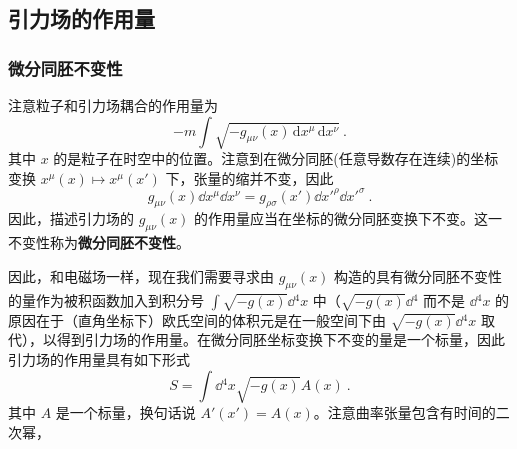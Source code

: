 \subsection{引力场的作用量}

\subsubsection{微分同胚不变性}
注意粒子和引力场耦合的作用量为
\begin{equation}
-m\int\sqrt{-g_{\mu\nu}(x) \,\mathrm{d}{x} ^\mu \,\mathrm{d}{x} ^\nu}~.
\end{equation}
其中 $x$ 的是粒子在时空中的位置。注意到在微分同胚(任意导数存在连续)的坐标变换 $x^\mu(x) \mapsto x^\mu(x')$ 下，张量的缩并不变，因此
\begin{equation}
g_{\mu\nu}(x) \dd x^\mu \dd{x} ^\nu=g_{\rho\sigma}(x') \dd{x'} ^\rho \dd{x'} ^{\sigma}~.
\end{equation}
因此，描述引力场的 $g_{\mu\nu}(x)$ 的作用量应当在坐标的微分同胚变换下不变。这一不变性称为\textbf{微分同胚不变性}。

因此，和电磁场一样，现在我们需要寻求由 $g_{\mu\nu}(x)$ 构造的具有微分同胚不变性的量作为被积函数加入到积分号 $\int\sqrt{-g(x)}\dd{}^4x$ 中（$\sqrt{-g(x)}\dd{}^4$ 而不是 $\dd{}^4x$ 的原因在于（直角坐标下）欧氏空间的体积元是在一般空间下由 $\sqrt{-g(x)}\dd{}^4 x$ 取代），以得到引力场的作用量。在微分同胚坐标变换下不变的量是一个标量，因此引力场的作用量具有如下形式
\begin{equation}
S=\int\dd{}^4x\sqrt{-g(x)}A(x)~.
\end{equation}
其中 $A$ 是一个标量，换句话说 $A'(x')=A(x)$。注意曲率张量包含有时间的二次幂，



























